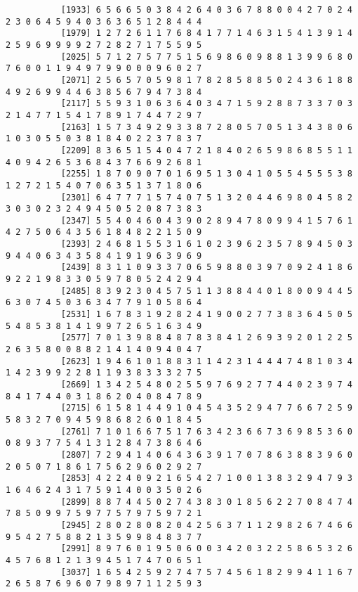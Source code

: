 \documentclass{article}
\begin{document}
\begin{itemize}
\begin{scriptsize}
\begin{verbatim}
		   [1933] 6 5 6 6 5 0 3 8 4 2 6 4 0 3 6 7 8 8 0 0 4 2 7 0 2 4 2 3 0 6 4 5 9 4 0 3 6 3 6 5 1 2 8 4 4 4
		   [1979] 1 2 7 2 6 1 1 7 6 8 4 1 7 7 1 4 6 3 1 5 4 1 3 9 1 4 2 5 9 6 9 9 9 9 2 7 2 8 2 7 1 7 5 5 9 5
		   [2025] 5 7 1 2 7 5 7 7 5 1 5 6 9 8 6 0 9 8 8 1 3 9 9 6 8 0 7 6 0 0 1 1 9 4 9 7 9 9 0 0 0 9 6 0 2 7
		   [2071] 2 5 6 5 7 0 5 9 8 1 7 8 2 8 5 8 8 5 0 2 4 3 6 1 8 8 4 9 2 6 9 9 4 4 6 3 8 5 6 7 9 4 7 3 8 4
		   [2117] 5 5 9 3 1 0 6 3 6 4 0 3 4 7 1 5 9 2 8 8 7 3 3 7 0 3 2 1 4 7 7 1 5 4 1 7 8 9 1 7 4 4 7 2 9 7
		   [2163] 1 5 7 3 4 9 2 9 3 3 8 7 2 8 0 5 7 0 5 1 3 4 3 8 0 6 1 0 3 0 5 5 0 3 8 1 8 4 0 2 2 3 7 8 3 7
		   [2209] 8 3 6 5 1 5 4 0 4 7 2 1 8 4 0 2 6 5 9 8 6 8 5 5 1 1 4 0 9 4 2 6 5 3 6 8 4 3 7 6 6 9 2 6 8 1
		   [2255] 1 8 7 0 9 0 7 0 1 6 9 5 1 3 0 4 1 0 5 5 4 5 5 5 3 8 1 2 7 2 1 5 4 0 7 0 6 3 5 1 3 7 1 8 0 6
		   [2301] 6 4 7 7 7 1 5 7 4 0 7 5 1 3 2 0 4 4 6 9 8 0 4 5 8 2 3 0 3 0 2 3 2 4 9 4 5 0 5 2 0 8 7 3 8 3
		   [2347] 5 5 4 0 4 6 0 4 3 9 0 2 8 9 4 7 8 0 9 9 4 1 5 7 6 1 4 2 7 5 0 6 4 3 5 6 1 8 4 8 2 2 1 5 0 9
		   [2393] 2 4 6 8 1 5 5 3 1 6 1 0 2 3 9 6 2 3 5 7 8 9 4 5 0 3 9 4 4 0 6 3 4 3 5 8 4 1 9 1 9 6 3 9 6 9
		   [2439] 8 3 1 1 0 9 3 3 7 0 6 5 9 8 8 0 3 9 7 0 9 2 4 1 8 6 9 2 2 1 9 8 3 3 0 5 9 7 8 0 5 2 4 2 9 4
		   [2485] 8 3 9 2 3 0 4 5 7 5 1 1 3 8 8 4 4 0 1 8 0 0 9 4 4 5 6 3 0 7 4 5 0 3 6 3 4 7 7 9 1 0 5 8 6 4
		   [2531] 1 6 7 8 3 1 9 2 8 2 4 1 9 0 0 2 7 7 3 8 3 6 4 5 0 5 5 4 8 5 3 8 1 4 1 9 9 7 2 6 5 1 6 3 4 9
		   [2577] 7 0 1 3 9 8 8 4 8 7 8 3 8 4 1 2 6 9 3 9 2 0 1 2 2 5 2 6 3 5 8 0 0 8 8 2 1 4 1 4 0 9 4 0 4 7
		   [2623] 1 9 4 6 1 0 1 8 8 3 1 1 4 2 3 1 4 4 4 7 4 8 1 0 3 4 1 4 2 3 9 9 2 2 8 1 1 9 3 8 3 3 3 2 7 5
		   [2669] 1 3 4 2 5 4 8 0 2 5 5 9 7 6 9 2 7 7 4 4 0 2 3 9 7 4 8 4 1 7 4 4 0 3 1 8 6 2 0 4 0 8 4 7 8 9
		   [2715] 6 1 5 8 1 4 4 9 1 0 4 5 4 3 5 2 9 4 7 7 6 6 7 2 5 9 5 8 3 2 7 0 9 4 5 9 8 6 8 2 6 0 1 8 4 5
		   [2761] 7 1 0 1 6 6 7 5 1 7 6 3 4 2 3 6 6 7 3 6 9 8 5 3 6 0 0 8 9 3 7 7 5 4 1 3 1 2 8 4 7 3 8 6 4 6
		   [2807] 7 2 9 4 1 4 0 6 4 3 6 3 9 1 7 0 7 8 6 3 8 8 3 9 6 0 2 0 5 0 7 1 8 6 1 7 5 6 2 9 6 0 2 9 2 7
		   [2853] 4 2 2 4 0 9 2 1 6 5 4 2 7 1 0 0 1 3 8 3 2 9 4 7 9 3 1 6 4 6 2 4 3 1 7 5 9 1 4 0 0 3 5 0 2 6
		   [2899] 8 8 7 4 4 5 0 2 7 4 3 8 3 0 1 8 5 6 2 2 7 0 8 4 7 4 7 8 5 0 9 9 7 5 9 7 7 5 7 9 7 5 9 7 2 1
		   [2945] 2 8 0 2 8 0 8 2 0 4 2 5 6 3 7 1 1 2 9 8 2 6 7 4 6 6 9 5 4 2 7 5 8 8 2 1 3 5 9 9 8 4 8 3 7 7
		   [2991] 8 9 7 6 0 1 9 5 0 6 0 0 3 4 2 0 3 2 2 5 8 6 5 3 2 6 4 5 7 6 8 1 2 1 3 9 4 5 1 7 4 7 0 6 5 1
		   [3037] 1 6 5 4 2 5 9 2 7 4 7 5 7 4 5 6 1 8 2 9 9 4 1 1 6 7 2 6 5 8 7 6 9 6 0 7 9 8 9 7 1 1 2 5 9 3

\end{verbatim}
\end{scriptsize}
\end{itemize}
\end{document}
